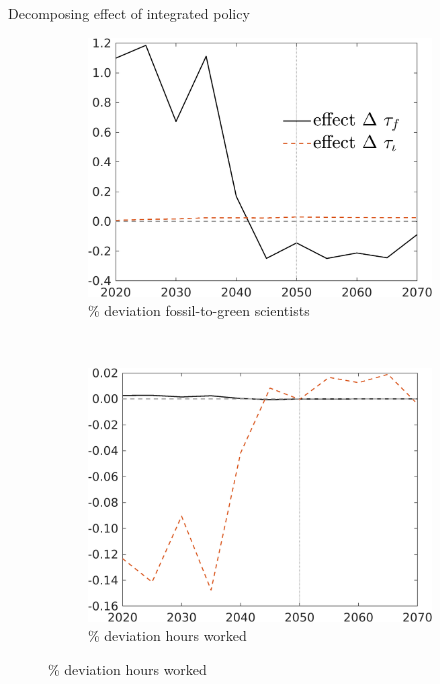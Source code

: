 \documentclass[11pt,aspectratio=169]{beamer}
\begin{document}
\begin{frame}{Decomposing effect of integrated policy }
\hypertarget{mec0}{}
\vspace{-3mm}
\centering
\begin{figure}
	\begin{subfigure}{0.45\textwidth}
		\caption{{\% deviation fossil-to-green scientists }}
		\includegraphics[width=1\textwidth]{../codding_model/own_basedOnFried/optimalPol_010922_revision/figures/all_13Sept22/NewCalib_polTaulFixedTaufJointPer_sffsg_Sun2_emnet1_spillover0_knspil3_xgr0_nsk0_sep0_extern0_PV1_etaa0.79_lgd1.png}
	\end{subfigure}
	\begin{minipage}[]{0.05\textwidth}
		\
	\end{minipage}
	\begin{subfigure}{0.45\textwidth}
		\caption{{\% deviation hours worked }}
		\includegraphics[width=1\textwidth]{../codding_model/own_basedOnFried/optimalPol_010922_revision/figures/all_13Sept22/NewCalib_polTaulFixedTaufJointPer_Hagg_Sun2_emnet1_spillover0_knspil3_xgr0_nsk0_sep0_extern0_PV1_etaa0.79_lgd0.png}

\end{subfigure}
\end{figure}
\end{frame}
\end{document}

